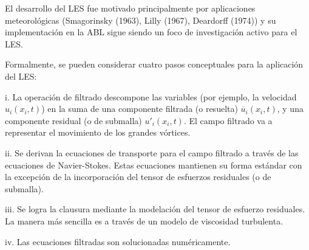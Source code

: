 El desarrollo del LES fue motivado principalmente por aplicaciones meteorológicas (Smagorinsky (1963), Lilly (1967), Deardorff (1974)) y su implementación en la ABL sigue siendo un foco de investigación activo para el LES. 

Formalmente, se pueden considerar cuatro pasos conceptuales para la aplicación del LES:
\begin{enumerate*}
	\item[i.] La operación de filtrado descompone las variables (por ejemplo, la velocidad $u_i(x_i,t)$) en la suma de una componente filtrada (o resuelta) $\overline{u}_i(x_i,t)$, y una componente residual (o de submalla) $u'_i(x_i,t)$. El campo filtrado va a representar el movimiento de los grandes vórtices.
	\item[ii.] Se derivan la ecuaciones de transporte para el campo filtrado a través de las ecuaciones de Navier-Stokes. Estas ecuaciones mantienen su forma estándar con la excepción de la incorporación del tensor de esfuerzos residuales (o de submalla).
	\item[iii.] Se logra la clausura mediante la modelación del tensor de esfuerzo residuales. La manera más sencilla es a través de un modelo de viscosidad turbulenta.
	\item[iv.] Las ecuaciones filtradas son solucionadas numéricamente.
\end{enumerate*}
